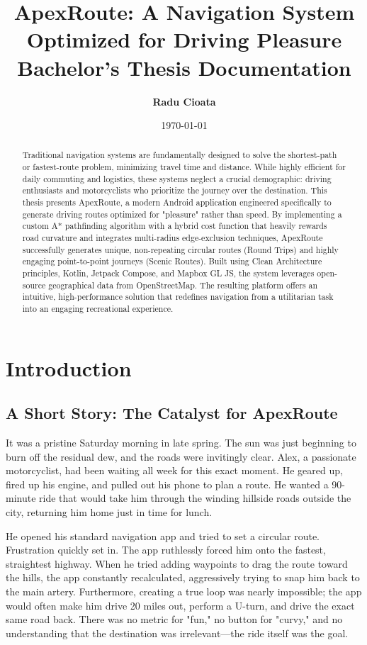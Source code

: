 \documentclass[12pt,a4paper,oneside]{report}
\title{
    \vspace{2cm}
    \Huge \textbf{ApexRoute: A Navigation System Optimized for Driving Pleasure} \\
    \vspace{1cm}
    \Large Bachelor's Thesis Documentation
}
\author{\textbf{Radu Cioata}}
\date{\vfill \today}
\begin{document}
\maketitle

\begin{abstract}
Traditional navigation systems are fundamentally designed to solve the shortest-path or fastest-route problem, minimizing travel time and distance. While highly efficient for daily commuting and logistics, these systems neglect a crucial demographic: driving enthusiasts and motorcyclists who prioritize the journey over the destination. This thesis presents ApexRoute, a modern Android application engineered specifically to generate driving routes optimized for "pleasure" rather than speed. By implementing a custom A* pathfinding algorithm with a hybrid cost function that heavily rewards road curvature and integrates multi-radius edge-exclusion techniques, ApexRoute successfully generates unique, non-repeating circular routes (Round Trips) and highly engaging point-to-point journeys (Scenic Routes). Built using Clean Architecture principles, Kotlin, Jetpack Compose, and Mapbox GL JS, the system leverages open-source geographical data from OpenStreetMap. The resulting platform offers an intuitive, high-performance solution that redefines navigation from a utilitarian task into an engaging recreational experience.
\end{abstract}

\tableofcontents
\listoffigures
\listoftables

\chapter{Introduction}

\section{A Short Story: The Catalyst for ApexRoute}
It was a pristine Saturday morning in late spring. The sun was just beginning to burn off the residual dew, and the roads were invitingly clear. Alex, a passionate motorcyclist, had been waiting all week for this exact moment. He geared up, fired up his engine, and pulled out his phone to plan a route. He wanted a 90-minute ride that would take him through the winding hillside roads outside the city, returning him home just in time for lunch.

He opened his standard navigation app and tried to set a circular route. Frustration quickly set in. The app ruthlessly forced him onto the fastest, straightest highway. When he tried adding waypoints to drag the route toward the hills, the app constantly recalculated, aggressively trying to snap him back to the main artery. Furthermore, creating a true loop was nearly impossible; the app would often make him drive 20 miles out, perform a U-turn, and drive the exact same road back. There was no metric for "fun," no button for "curvy," and no understanding that the destination was irrelevant—the ride itself was the goal.
\end{document}
